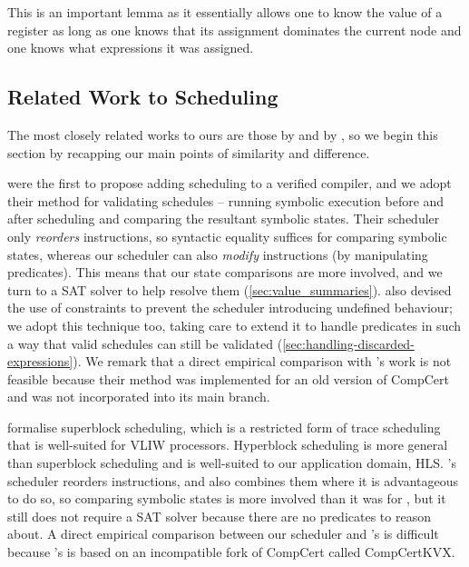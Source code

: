 This is an important lemma as it essentially allows one to know the value of a
register as long as one knows that its assignment dominates the current node and
one knows what expressions it was assigned.

\subsection{Related Work to Scheduling}%
\label{sec:related-work}

The most closely related works to ours are those by
\textcite{tristan08_formal_verif_trans_valid} and by
\textcite{six22_formal_verif_super_sched}, so we begin this section by recapping
our main points of similarity and difference.

\textcite{tristan08_formal_verif_trans_valid} were the first to propose adding
scheduling to a verified compiler, and we adopt their method for validating
schedules -- running symbolic execution before and after scheduling and
comparing the resultant symbolic states. Their scheduler only \emph{reorders}
instructions, so syntactic equality suffices for comparing symbolic states,
whereas our scheduler can also \emph{modify} instructions (by manipulating
predicates). This means that our state comparisons are more involved, and we
turn to a SAT solver to help resolve them
(\cref{sec:value_summaries}). \citeauthor{tristan08_formal_verif_trans_valid}
also devised the use of constraints to prevent the scheduler introducing
undefined behaviour; we adopt this technique too, taking care to extend it to
handle predicates in such a way that valid schedules can still be validated
(\cref{sec:handling-discarded-expressions}). We remark that a direct empirical
comparison with \citeauthor{tristan08_formal_verif_trans_valid}'s work is not
feasible because their method was implemented for an old version of CompCert and
was not incorporated into its main branch.

\textcite{six22_formal_verif_super_sched} formalise superblock scheduling, which
is a restricted form of trace scheduling that is well-suited for VLIW
processors. Hyperblock scheduling is more general than superblock scheduling and
is well-suited to our application domain,
HLS. \citeauthor{six22_formal_verif_super_sched}'s scheduler reorders
instructions, and also combines them where it is advantageous to do so, so
comparing symbolic states is more involved than it was for
\citeauthor{tristan08_formal_verif_trans_valid}, but it still does not require a
SAT solver because there are no predicates to reason about. A direct empirical
comparison between our scheduler and
\citeauthor{six22_formal_verif_super_sched}'s is difficult because
\citeauthor{six22_formal_verif_super_sched}'s is based on an incompatible fork
of CompCert called CompCertKVX.

